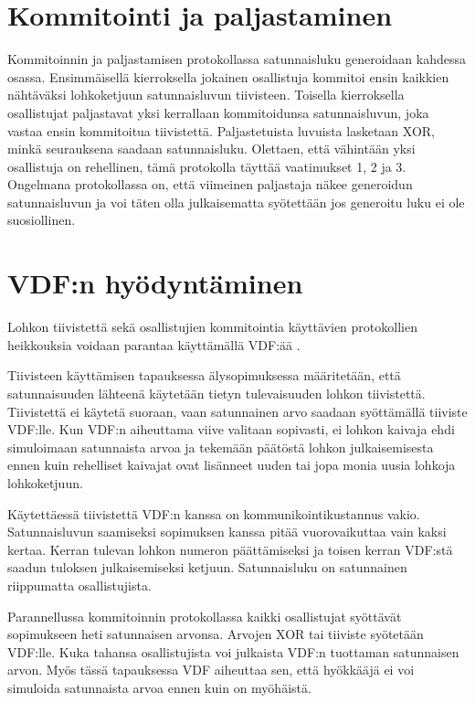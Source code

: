 \section{Kommitointi ja paljastaminen} %
Kommitoinnin ja paljastamisen protokollassa satunnaisluku generoidaan kahdessa osassa. Ensimmäisellä kierroksella jokainen osallistuja kommitoi ensin kaikkien nähtäväksi lohkoketjuun satunnaisluvun tiivisteen. Toisella kierroksella osallistujat paljastavat yksi kerrallaan kommitoidunsa satunnaisluvun, joka vastaa ensin kommitoitua tiivistettä. Paljastetuista luvuista lasketaan XOR, minkä seurauksena saadaan satunnaisluku. Olettaen, että vähintään yksi osallistuja on rehellinen, tämä protokolla täyttää vaatimukset 1, 2 ja 3. Ongelmana protokollassa on, että viimeinen paljastaja näkee generoidun satunnaisluvun ja voi täten olla julkaisematta syötettään jos generoitu luku ei ole suosiollinen. 

\section{VDF:n hyödyntäminen}
Lohkon tiivistettä sekä osallistujien kommitointia käyttävien protokollien heikkouksia voidaan parantaa käyttämällä VDF:ää \cite{boneh_verifiable_2018}. 

Tiivisteen käyttämisen tapauksessa älysopimuksessa määritetään, että satunnaisuuden lähteenä käytetään tietyn tulevaisuuden lohkon tiivistettä. Tiivistettä ei käytetä suoraan, vaan satunnainen arvo saadaan syöttämällä tiiviste VDF:lle. Kun VDF:n aiheuttama viive valitaan sopivasti, ei lohkon kaivaja ehdi simuloimaan satunnaista arvoa ja tekemään päätöstä lohkon julkaisemisesta ennen kuin rehelliset kaivajat ovat lisänneet uuden tai jopa monia uusia lohkoja lohkoketjuun.

Käytettäessä tiivistettä VDF:n kanssa on kommunikointikustannus vakio. Satunnaisluvun saamiseksi sopimuksen kanssa pitää vuorovaikuttaa vain kaksi kertaa. Kerran tulevan lohkon numeron päättämiseksi ja toisen kerran VDF:stä saadun tuloksen julkaisemiseksi ketjuun. Satunnaisluku on satunnainen riippumatta osallistujista.

Parannellussa kommitoinnin protokollassa kaikki osallistujat syöttävät sopimukseen heti satunnaisen arvonsa. Arvojen XOR tai tiiviste syötetään VDF:lle. Kuka tahansa osallistujista voi julkaista VDF:n tuottaman satunnaisen arvon. Myös tässä tapauksessa VDF aiheuttaa sen, että hyökkääjä ei voi simuloida satunnaista arvoa ennen kuin on myöhäistä. 

